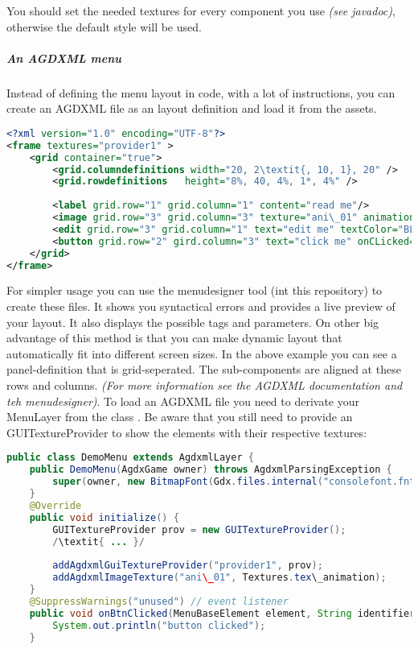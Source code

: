 You should set the needed textures for every component you use \textit{(see javadoc)}, otherwise the default style will be used.

\subparagraph{An AGDXML menu}

Instead of defining the menu layout in code, with a lot of instructions, you can create an AGDXML file as an layout definition and load it from the assets.

\doinline
\begin{lstlisting}[caption=Markdown Tutorial: fenced code block, title=\hspace{0 pt}, language=xml]
<?xml version="1.0" encoding="UTF-8"?>
<frame textures="provider1" >
	<grid container="true">
		<grid.columndefinitions width="20, 2\textit{, 10, 1}, 20" />
		<grid.rowdefinitions   height="8%, 40, 4%, 1*, 4%" />
		
		<label grid.row="1" grid.column="1" content="read me"/>
		<image grid.row="3" grid.column="3" texture="ani\_01" animation="750" id="myImage001"/>
		<edit grid.row="3" grid.column="1" text="edit me" textColor="BLACK" halign="LEFT" />
		<button grid.row="2" gird.column="3" text="click me" onCLicked="onBtnClicked" />
	</grid>
</frame>
\end{lstlisting}

For simpler usage you can use the menudesigner tool (int this repository) to create these files. It shows you syntactical errors and provides a live preview of your layout. It also displays the possible tags and parameters.
On other big advantage of this method is that you can make dynamic layout that automatically fit into different screen sizes. In the above example you can see a panel-definition that is grid-seperated. The sub-components are aligned at these rows and columns. \textit{(For more information see the AGDXML documentation and teh menudesigner)}.
To load an AGDXML file you need to derivate your MenuLayer from the class . Be aware that you still need to provide an GUITextureProvider to show the elements with their respective textures:

\doinline
\begin{lstlisting}[caption=Markdown Tutorial: fenced code block, title=\hspace{0 pt}, language=java]
public class DemoMenu extends AgdxmlLayer {
	public DemoMenu(AgdxGame owner) throws AgdxmlParsingException {
		super(owner, new BitmapFont(Gdx.files.internal("consolefont.fnt")), Gdx.files.internal("demomenu.agdxml"));
	}
	@Override
	public void initialize() {
		GUITextureProvider prov = new GUITextureProvider();
		/\textit{ ... }/
		
		addAgdxmlGuiTextureProvider("provider1", prov);
		addAgdxmlImageTexture("ani\_01", Textures.tex\_animation);
	}
	@SuppressWarnings("unused") // event listener
	public void onBtnClicked(MenuBaseElement element, String identifier) {
		System.out.println("button clicked");
	}
\end{lstlisting}
